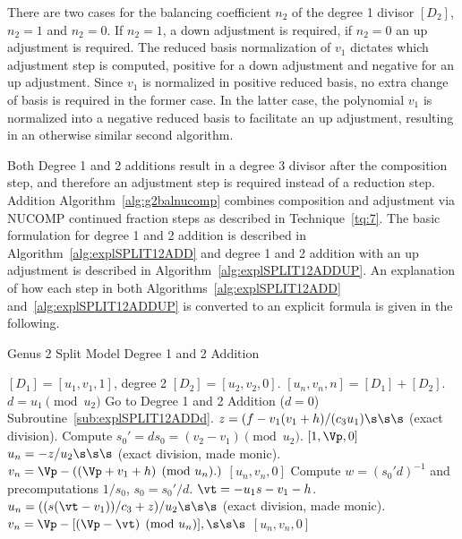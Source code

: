 There are two cases for the balancing coefficient $n_2$ of the degree 1 divisor
$[D_2]$, $n_2=1$ and $n_2 = 0$. If $n_2=1$, a down adjustment is required, if
$n_2=0$ an up adjustment is required. The reduced basis normalization of $v_1$
dictates which adjustment step is computed, positive for a down adjustment and
negative for an up adjustment. Since $v_1$ is normalized in positive reduced
basis, no extra change of basis is required in the former case. In the latter
case, the polynomial $v_1$ is normalized into a negative reduced basis to
facilitate an up adjustment, resulting in an otherwise similar second algorithm.

Both Degree 1 and 2 additions result in a degree 3 divisor after the composition
step, and therefore an adjustment step is required instead of a reduction step.
Addition Algorithm~\ref{alg:g2balnucomp} combines composition and adjustment via
NUCOMP continued fraction steps as described in Technique~\ref{tq:7}. The basic
formulation for degree 1 and 2 addition is described in
Algorithm~\ref{alg:explSPLIT12ADD} and degree 1 and 2 addition with an up
adjustment is described in Algorithm~\ref{alg:explSPLIT12ADDUP}. An explanation
of how each step in both Algorithms~\ref{alg:explSPLIT12ADD}
and~\ref{alg:explSPLIT12ADDUP} is converted to an explicit formula is given in
the following.

\begin{algorithm}[htbp]
\caption{Genus 2 Split Model Degree 1 and 2 Addition\label{alg:explSPLIT12ADD}}
\begin{algorithmic} [1]
\Require $[D_1] = [u_1,v_1,1]$, degree 2 $[D_2] = [u_2,v_2,0]$.\smallskip
\Ensure $[u_n,v_n,n] = [D_1] + [D_2] $.
\algrule
\State $d = u_1 \pmod{u_2}$
    \State Go to Degree 1 and 2 Addition ($d = 0$) Subroutine~\ref{sub:explSPLIT12ADDd}.
\EndIf
\State $z = (f - v_1(v_1 + h)/(c_3u_1) \s\s\s$ (exact division).
\State Compute $s_0' = ds_0 = (v_2 - v_1) \pmod{u_2}$.
     \Return $[1,\Vp,0]$
    \EndIf
\Else 
    \State $u_n = -z/u_2 \s\s\s$ (exact division, made monic).
    \State $v_n = \Vp - ((\Vp + v_1 + h)  \pmod{u_n}.)$
    \State \Return $[u_n,v_n,0]$
\EndIf
\State Compute $w = (s_0'd)^{-1}$ and precomputations $1/s_0$, $s_0 = s_0'/d$.
\State $\vt = -u_1s - v_1 - h$.
\State $u_n = ((s(\vt - v_1))/c_3 + z)/u_2 \s\s\s$ (exact division, made monic).
\State $v_n = \Vp - [(\Vp - \vt) \pmod{u_n}], \s\s\s$
\State \Return $[u_n,v_n,0]$
\end{algorithmic}
\end{algorithm}

